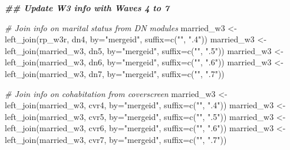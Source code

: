 \documentclass[
]{article}
\newenvironment{Shaded}{\begin{snugshade}}{\end{snugshade}}
\newcommand{\AttributeTok}[1]{\textcolor[rgb]{0.77,0.63,0.00}{#1}}
\newcommand{\CommentTok}[1]{\textcolor[rgb]{0.56,0.35,0.01}{\textit{#1}}}
\newcommand{\DocumentationTok}[1]{\textcolor[rgb]{0.56,0.35,0.01}{\textbf{\textit{#1}}}}
\newcommand{\FunctionTok}[1]{\textcolor[rgb]{0.00,0.00,0.00}{#1}}
\newcommand{\NormalTok}[1]{#1}
\newcommand{\OtherTok}[1]{\textcolor[rgb]{0.56,0.35,0.01}{#1}}
\newcommand{\StringTok}[1]{\textcolor[rgb]{0.31,0.60,0.02}{#1}}
\begin{document}
\begin{Shaded}
\begin{Highlighting}[]
\DocumentationTok{\#\# Update W3 info with Waves 4 to 7}

\CommentTok{\# Join info on marital status from DN modules}
\NormalTok{married\_w3 }\OtherTok{\textless{}{-}} \FunctionTok{left\_join}\NormalTok{(rp\_w3r, dn4, }\AttributeTok{by=}\StringTok{"mergeid"}\NormalTok{, }\AttributeTok{suffix=}\FunctionTok{c}\NormalTok{(}\StringTok{""}\NormalTok{, }\StringTok{".4"}\NormalTok{))}
\NormalTok{married\_w3 }\OtherTok{\textless{}{-}} \FunctionTok{left\_join}\NormalTok{(married\_w3, dn5, }\AttributeTok{by=}\StringTok{"mergeid"}\NormalTok{, }\AttributeTok{suffix=}\FunctionTok{c}\NormalTok{(}\StringTok{""}\NormalTok{, }\StringTok{".5"}\NormalTok{))}
\NormalTok{married\_w3 }\OtherTok{\textless{}{-}} \FunctionTok{left\_join}\NormalTok{(married\_w3, dn6, }\AttributeTok{by=}\StringTok{"mergeid"}\NormalTok{, }\AttributeTok{suffix=}\FunctionTok{c}\NormalTok{(}\StringTok{""}\NormalTok{, }\StringTok{".6"}\NormalTok{))}
\NormalTok{married\_w3 }\OtherTok{\textless{}{-}} \FunctionTok{left\_join}\NormalTok{(married\_w3, dn7, }\AttributeTok{by=}\StringTok{"mergeid"}\NormalTok{, }\AttributeTok{suffix=}\FunctionTok{c}\NormalTok{(}\StringTok{""}\NormalTok{, }\StringTok{".7"}\NormalTok{))}


\CommentTok{\# Join info on cohabitation from coverscreen}
\NormalTok{married\_w3 }\OtherTok{\textless{}{-}} \FunctionTok{left\_join}\NormalTok{(married\_w3, cvr4, }\AttributeTok{by=}\StringTok{"mergeid"}\NormalTok{, }\AttributeTok{suffix=}\FunctionTok{c}\NormalTok{(}\StringTok{""}\NormalTok{, }\StringTok{".4"}\NormalTok{))}
\NormalTok{married\_w3 }\OtherTok{\textless{}{-}} \FunctionTok{left\_join}\NormalTok{(married\_w3, cvr5, }\AttributeTok{by=}\StringTok{"mergeid"}\NormalTok{, }\AttributeTok{suffix=}\FunctionTok{c}\NormalTok{(}\StringTok{""}\NormalTok{, }\StringTok{".5"}\NormalTok{))}
\NormalTok{married\_w3 }\OtherTok{\textless{}{-}} \FunctionTok{left\_join}\NormalTok{(married\_w3, cvr6, }\AttributeTok{by=}\StringTok{"mergeid"}\NormalTok{, }\AttributeTok{suffix=}\FunctionTok{c}\NormalTok{(}\StringTok{""}\NormalTok{, }\StringTok{".6"}\NormalTok{))}
\NormalTok{married\_w3 }\OtherTok{\textless{}{-}} \FunctionTok{left\_join}\NormalTok{(married\_w3, cvr7, }\AttributeTok{by=}\StringTok{"mergeid"}\NormalTok{, }\AttributeTok{suffix=}\FunctionTok{c}\NormalTok{(}\StringTok{""}\NormalTok{, }\StringTok{".7"}\NormalTok{))}



\end{Highlighting}
\end{Shaded}
\end{document}
